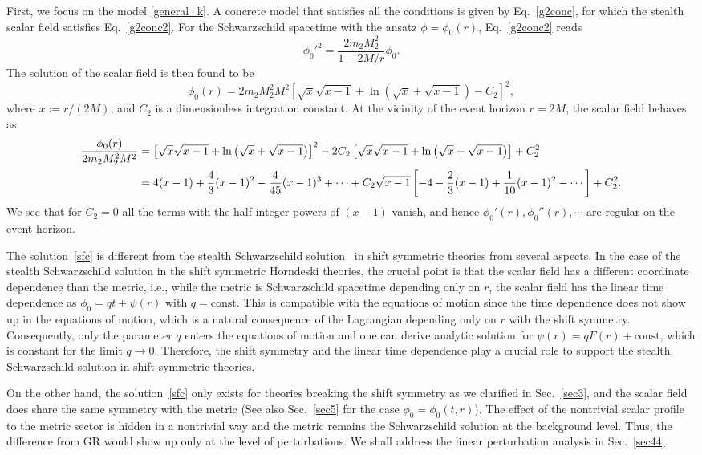 \documentclass[prd,amsmath,amssymb,floatfix,superscriptaddress,notitlepage,nofootinbib,preprintnumbers]{revtex4-1}
\newcommand{\f}[2]{\frac{#1}{#2}}
\newcommand{\mk}[1]{\left( #1 \right)}
\newcommand{\kk}[1]{\left[ #1 \right]}
\newcommand{\be}{\begin{equation}}
\newcommand{\ee}{\end{equation}}
\begin{document}
First, we focus on the model \eqref{general_k}.
A concrete model that satisfies all the conditions is given by Eq.~\eqref{g2conc},
for which the stealth scalar field  
satisfies Eq.~\eqref{g2conc2}.
For the Schwarzschild spacetime with the ansatz $\phi=\phi_0(r)$, Eq.~\eqref{g2conc2} reads
\be 
\phi_0'^2=\f{2m_2M_2^2}{1-2M/r}\phi_0.
\ee
The solution of the scalar field is then found to be
\be \label{sfc}
\phi_0(r) = 2 m_2M_2^2 M^2 \kk{ \sqrt{x} \sqrt{x - 1 } + \ln\mk{ \sqrt{x} + \sqrt{x - 1 } } - C_2}^2 ,\ee
where $x:=r/(2M)$, and
$C_2$ is a dimensionless integration constant.
At the vicinity of the event horizon $r= 2M$, 
the scalar field behaves as
\begin{align} 
\f{\phi_0(r)}{2 m_2M_2^2 M^2} &= \kk{ \sqrt{x} \sqrt{x - 1 } + \ln\mk{ \sqrt{x} + \sqrt{x - 1 } } }^2  - 2C_2 \kk{ \sqrt{x} \sqrt{x - 1 } + \ln\mk{ \sqrt{x} + \sqrt{x - 1 } } } + C_2^2  \notag\\
&= 4 (x - 1) + \f{4}{3} (x - 1)^2 - \f{4}{45} (x - 1)^3 + \cdots +C_2\sqrt{x - 1}\kk{ -4  - \f{2}{3} (x - 1) + \f{1}{10} (x - 1)^2 - \cdots } + C_2^2 .
\end{align}
We see that for $C_2=0$ all the terms with the half-integer powers of $(x-1)$ vanish,
and hence $\phi_0'(r), \phi_0''(r),\cdots$ are regular on the event horizon. 


The solution~\eqref{sfc} is different from the stealth Schwarzschild solution~\cite{Babichev:2013cya,Kobayashi:2014eva} 
in shift symmetric theories from several aspects.
In the case of the stealth Schwarzschild solution in the shift symmetric Horndeski theories, 
the crucial point is that the scalar field has a different coordinate dependence than the metric, 
i.e., while the metric is Schwarzschild spacetime depending only on $r$, 
the scalar field has the linear time dependence as $\phi_0=qt+\psi(r)$ with $q=\text{const}$. 
This is compatible with the equations of motion since
the time dependence does not show up 
in the equations of motion, which is a natural consequence 
of the Lagrangian depending only on $r$ with the shift symmetry.
Consequently, only the parameter $q$ enters the equations of motion and one can derive analytic solution for $\psi(r)= q F(r)+\text{const}$, which is constant for the limit $q\to 0$.
Therefore, the shift symmetry and the linear time dependence 
play a crucial role to support the stealth Schwarzschild solution
in shift symmetric theories.


On the other hand, the solution~\eqref{sfc} only exists for theories breaking the shift symmetry
as we clarified in Sec.~\ref{sec3},
and the scalar field does share the same symmetry with the metric
(See also Sec.~\ref{sec5} for the case $\phi_0=\phi_0(t,r)$).
The effect of the nontrivial scalar profile to the metric sector is hidden in a nontrivial way
and the metric remains the Schwarzschild solution at the background level. 
Thus, the difference from GR would show up only at the level of perturbations.
We shall address the linear perturbation analysis in Sec.~\ref{sec44}.
\end{document}
